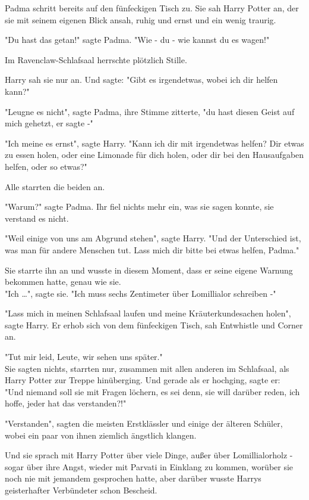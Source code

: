 {Padma schritt bereits auf den fünfeckigen Tisch zu. Sie sah Harry Potter an, der sie mit seinem eigenen Blick ansah, ruhig und ernst und ein wenig traurig.

"Du hast das getan!" sagte Padma. "Wie - du - wie kannst du es wagen!"

Im Ravenclaw-Schlafsaal herrschte plötzlich Stille.

Harry sah sie nur an. Und sagte: "Gibt es irgendetwas, wobei ich dir helfen kann?"

"Leugne es nicht", sagte Padma, ihre Stimme zitterte, "du hast diesen Geist auf mich gehetzt, er sagte -"

"Ich meine es ernst", sagte Harry. "Kann ich dir mit irgendetwas helfen? Dir etwas zu essen holen, oder eine Limonade für dich holen, oder dir bei den Hausaufgaben helfen, oder so etwas?"

Alle starrten die beiden an.

"Warum?" sagte Padma. Ihr fiel nichts mehr ein, was sie sagen konnte, sie verstand es nicht.

"Weil einige von uns am Abgrund stehen", sagte Harry. "Und der Unterschied ist, was man für andere Menschen tut. Lass mich dir bitte bei etwas helfen, Padma."

Sie starrte ihn an und wusste in diesem Moment, dass er seine eigene Warnung bekommen hatte, genau wie sie.\\ "Ich …", sagte sie. "Ich muss sechs Zentimeter über Lomillialor schreiben -"

"Lass mich in meinen Schlafsaal laufen und meine Kräuterkundesachen holen", sagte Harry. Er erhob sich von dem fünfeckigen Tisch, sah Entwhistle und Corner an.

"Tut mir leid, Leute, wir sehen uns später."\\ Sie sagten nichts, starrten nur, zusammen mit allen anderen im Schlafsaal, als Harry Potter zur Treppe hinüberging. Und gerade als er hochging, sagte er:\\ "Und niemand soll sie mit Fragen löchern, es sei denn, sie will darüber reden, ich hoffe, jeder hat das verstanden?!"

"Verstanden", sagten die meisten Erstklässler und einige der älteren Schüler, wobei ein paar von ihnen ziemlich ängstlich klangen.

Und sie sprach mit Harry Potter über viele Dinge, außer über Lomillialorholz - sogar über ihre Angst, wieder mit Parvati in Einklang zu kommen, worüber sie noch nie mit jemandem gesprochen hatte, aber darüber wusste Harrys geisterhafter Verbündeter schon Bescheid.

}
